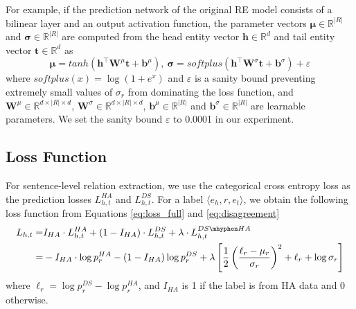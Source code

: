 \documentclass[11pt]{article}
\newcommand{\triple}[3]{\ensuremath{\langle #1,#2,#3\rangle}}
\newcommand{\ehead}{e_{h}}
\newcommand{\etail}{e_{t}}
\newcommand{\vect}[1]{\boldsymbol{\mathbf{#1}}}
\newcommand{\transpose}[1]{{#1}^\top}
\newcommand{\realset}[1]{\mathbb{R}^{#1}}
\newcommand{\inmid}{\!\in\!}
\begin{document}
For example, if the prediction network of the original RE model consists of a bilinear layer and an output activation function,
the parameter vectors $\vect{\mu}\inmid \realset{|R|}$ and $\vect{\sigma}\inmid \realset{|R|}$ are computed from the head entity vector $\vect{h}\inmid \realset{d}$ and tail entity vector $\vect{t}\inmid \realset{d}$ as
\begin{equation*}
\vect{\mu} = tanh({\transpose{\vect{h}}\vect{W}^\mu\vect{t}+\vect{b}^\mu}), ~\vect{\sigma} = softplus({\transpose{\vect{h}}\vect{W}^\sigma\vect{t}+\vect{b}^\sigma}) + \varepsilon
\end{equation*}
where $softplus(x) = \log{(1+e^x)}$ and $\varepsilon$ is a sanity bound preventing extremely small values of $\sigma_r$ from dominating the loss function, and $\vect{W}^\mu \inmid \realset{d \times |R| \times d}$, $\vect{W}^\sigma \inmid \realset{d \times |R| \times d}$, $\vect{b}^\mu \inmid \realset{|R|}$ and $\vect{b}^\sigma \inmid \realset{|R|}$ are learnable parameters.
We set the sanity bound $\varepsilon$ to 0.0001 in our experiment.



\subsection{Loss Function}
For sentence-level relation extraction, we use the categorical cross entropy loss as the prediction losses $L_{h,t}^{HA}$ and $L_{h,t}^{DS}$.
For a label \triple{\ehead}{r}{\etail}, we obtain the following loss function from Equations \eqref{eq:loss_full} and \eqref{eq:disagreement}
\begin{equation}
\label{eq:loss_sent}
\vspace{-0.02in}
\begin{aligned}
L_{h, t} =&I_{HA} \cdot L_{h,t}^{HA} + (1-I_{HA}) \cdot L_{h,t}^{DS} + \lambda \cdot L_{h,t}^{DS\mhyphen HA} \\
=& -I_{HA} \cdot \log{p^{HA}_{r}} -(1-I_{HA})\log{p^{DS}_{r}} + \lambda \left[\frac{1}{2}\left(\frac{\ell_r-\mu_r}{\sigma_r}\right)^2+\ell_r+\log{\sigma_r}\right]\\
\end{aligned}
\end{equation}
where  $\ell_r=\log{p^{DS}_{r}} - \log{p^{HA}_{r}}$, and $I_{HA}$ is 1 if the label is from HA data and 0 otherwise.
\end{document}
